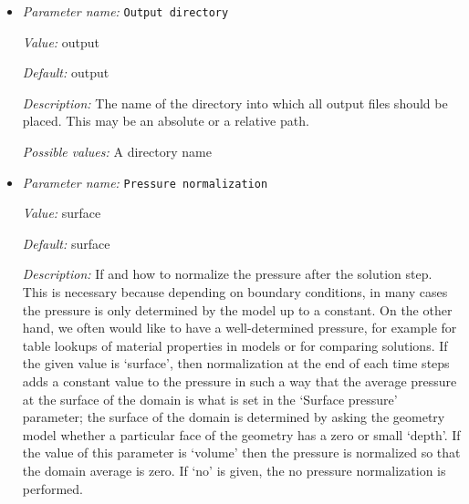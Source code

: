 \begin{itemize}
{\it Value:} 1e-5


{\it Default:} 1e-5


{\it Description:} A relative tolerance up to which the nonlinear solver will iterate. This parameter is only relevant if the `Nonlinear solver scheme' does nonlinear iterations, in other words, if it is set to something other than `single Advection, single Stokes' or `single Advection, no Stokes'.


{\it Possible values:} A floating point number $v$ such that $0 \leq v \leq 1$
\item {\it Parameter name:} {\tt Output directory}
\label{parameters:Output directory}


{\it Value:} output


{\it Default:} output


{\it Description:} The name of the directory into which all output files should be placed. This may be an absolute or a relative path.


{\it Possible values:} A directory name
\item {\it Parameter name:} {\tt Pressure normalization}
\label{parameters:Pressure normalization}


{\it Value:} surface


{\it Default:} surface


{\it Description:} If and how to normalize the pressure after the solution step. This is necessary because depending on boundary conditions, in many cases the pressure is only determined by the model up to a constant. On the other hand, we often would like to have a well-determined pressure, for example for table lookups of material properties in models or for comparing solutions. If the given value is `surface', then normalization at the end of each time steps adds a constant value to the pressure in such a way that the average pressure at the surface of the domain is what is set in the `Surface pressure' parameter; the surface of the domain is determined by asking the geometry model whether a particular face of the geometry has a zero or small `depth'. If the value of this parameter is `volume' then the pressure is normalized so that the domain average is zero. If `no' is given, the no pressure normalization is performed.



\end{itemize}

